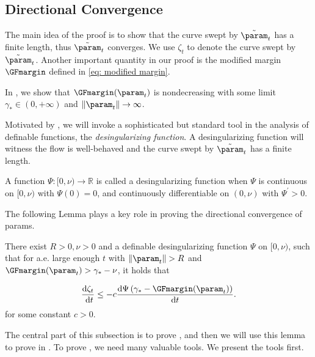 \subsection{Directional Convergence} \label{sec:proof:direct}
The main idea of the proof is to show that the curve swept by $\tilde{\param}_t$ has a finite length, thus $\tilde{\param}_t$ converges. We use $\zeta_t$ to denote the curve swept by $\tilde{\param}_t$. Another important quantity in our proof is the modified margin $\GFmargin$ defined in \eqref{eq: modified margin}. 

In , we show that $\GFmargin(\param_t)$ is nondecreasing with some limit $\gamma_* \in (0, +\infty)$ and $\|\param_t\|\to \infty$. 

Motivated by \citet{ji2020directional}, we will invoke a sophisticated but standard tool in the analysis of definable functions, the {\it desingularizing function}.  A desingularizing function will witness the flow is well-behaved and the curve swept by $\tilde{\param}_t$ has a finite length.


\begin{definition}
\label{def: designularizing function}
A function $\Psi:[0, \nu) \rightarrow \mathbb{R}$ is called a desingularizing function when $\Psi$ is continuous on $[0, \nu)$ with $\Psi(0)=0$, and continuously differentiable on $(0, \nu)$ with $\Psi^{\prime}>0$. 
\end{definition}

The following Lemma plays a key role in proving the directional convergence of params. 
\begin{lemma}
\label{lem: Existence of desingularizing function}
There exist $R>0, \nu>0$ and a definable desingularizing function $\Psi$ on $[0, \nu)$, such that for a.e. large enough $t$ with $\left\|\param_t\right\|>R$ and $\GFmargin(\param_t)>\gamma_*-\nu$, it holds that

$$
\frac{\mathrm{d} \zeta_t}{\mathrm{~d} t} \leq-c \frac{\mathrm{d} \Psi\left(\gamma_*-\GFmargin(\param_t)\right)}{\mathrm{d} t}. 
$$
for some constant $c>0$.
\end{lemma}
The central part of this subsection is to prove , and then we will use this lemma to prove  in . To prove , we need many valuable tools. We present the tools first.

